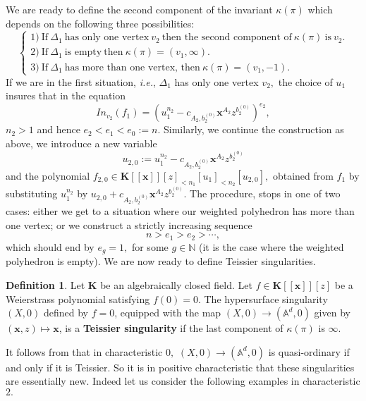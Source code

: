 \documentclass[11pt, a4paper]{amsart}
\numberwithin{equation}{section}
\theoremstyle{plain}
\theoremstyle{definition}
\newtheorem{Def}[Thm]{Definition}
\theoremstyle{remark}
\newcommand{\K}{\mathbf{K}}
\newcommand{\0}{{\boldsymbol 0}}
\newcommand{\x}{{\boldsymbol x}}
\begin{document}
We are ready to define the second component of the invariant $\kappa(\pi)$ which depends on the following three possibilities:
$$\left \{
    \begin{array}{ll}
      1)~ \mbox{If}~\Delta_1~ \mbox{has only one vertex}~ v_2~ \mbox{then the second component of}~\kappa(\pi)~\mbox{is}~ v_2. \\
      2) ~\mbox{If}~\Delta_1~ \mbox{is empty}~ \mbox{then}~\kappa(\pi)=(v_1,\infty). \\
    3) ~\mbox{If}~\Delta_1~ \mbox{has more than one vertex, then}~ \kappa(\pi)=(v_1,-1).
    \end{array}
    \right.
     $$
If we are in the first situation, \textit{i.e.}, $\Delta_1$ has only one vertex $v_2,$ the choice of $u_1$ insures that in the equation
 \begin{equation}
 In_{v_{2}}(f_{1})=(u_{1}^{n_{2}}-c_{A_2,b_2^{(0)}}\x^{A_2}z^{b_2^{(0)}})^{e_{2}},
 \end{equation}
 $n_2>1$ and hence $e_2<e_1<e_0:=n.$ Similarly, we continue the construction as above, we introduce a new variable  $$u_{2,0}:=u_{1}^{n_{2}}-c_{A_2,b_2^{(0)}}\x^{A_2}z^{b_2^{(0)}}$$
 and the polynomial $f_{2,0}\in\K[[\x]][z]_{<n_1}[u_1]_{<n_2}[u_{2,0}],$ obtained from $f_1$ by substituting $u_1^{n_2}$ by $u_{2,0}+c_{A_2,b_2^{(0)}}\x^{A_2}z^{b_2^{(0)}}.$ The procedure, stops in one of two cases: either we get to a situation where our weighted polyhedron has more than one vertex; or we construct a strictly increasing sequence 
 $$n>e_1>e_2>\cdots,$$
 which should end by $e_{g}=1,$ for some $g\in \mathbb{N}$ (it is the case where the weighted polyhedron is empty).
We are now ready to define Teissier singularities.

\begin{Def}
Let  $\textbf{K}$ be an algebraically closed field. Let $f\in \textbf{K}[[\x]][z]$ be a Weierstrass polynomial satisfying $f(0)=0.$ The hypersurface singularity $(X,0)$ defined by  $f=0$, equipped with the map $(X,0)\longrightarrow (\mathbb{A}^d,0)$ given by $(\x,z)\mapsto \x$, is a \textbf{Teissier singularity} if the last component of $\kappa(\pi)$ is $\infty.$
\end{Def}
It follows from \cite{MS} that in characteristic $0,$ $(X,0)\longrightarrow (\mathbb{A}^d,0)$ is quasi-ordinary if and only if it is Teissier. So it is in positive characteristic that these singularities are essentially new. Indeed let us consider the following examples in characteristic $2.$
\end{document}
